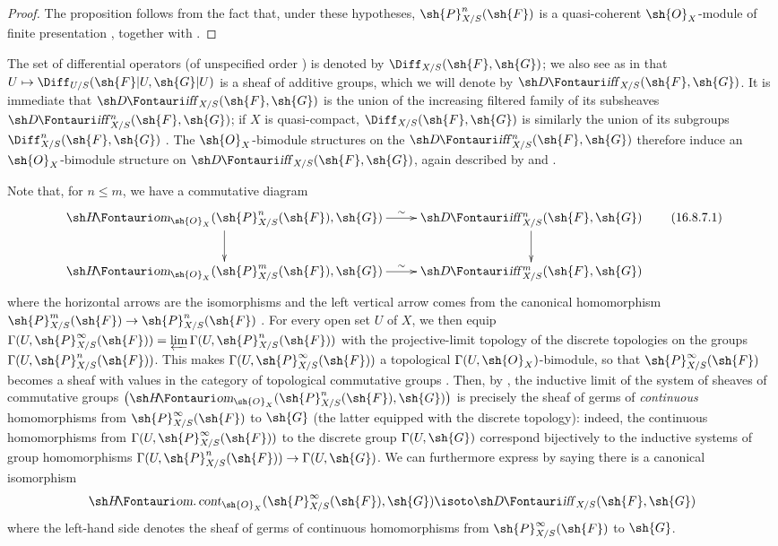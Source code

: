 \begin{proof}
The proposition follows from the fact that, under these hypotheses, $\sh{P}_{X/S}^n(\sh{F})$ is a quasi-coherent $\sh{O}_X$-module of finite presentation , together with .
\end{proof}

\begin{env}[16.8.7]
\label{IV.16.8.7}
The set of differential operators (of unspecified order ) is denoted by $\Diff_{X/S}(\sh{F}, \sh{G})$;
we also see as in  that $U \mapsto \Diff_{U/S}(\sh{F}|U, \sh{G}|U)$ is a sheaf of additive groups, which we will denote by $\shDiff_{X/S}(\sh{F}, \sh{G})$.
It is immediate that $\shDiff_{X/S}(\sh{F}, \sh{G})$ is the union of the increasing filtered family of its subsheaves $\shDiff_{X/S}^n(\sh{F}, \sh{G})$;
if $X$ is quasi-compact, $\Diff_{X/S}(\sh{F}, \sh{G})$ 
is similarly the union of its subgroups $\Diff_{X/S}^n(\sh{F}, \sh{G})$ .
The $\sh{O}_X$-bimodule structures on the $\shDiff_{X/S}^n(\sh{F}, \sh{G})$ therefore induce an $\sh{O}_X$-bimodule structure on $\shDiff_{X/S}(\sh{F}, \sh{G})$, again described by  and .

Note that, for $n \leq m$, we have a commutative diagram
\[
  \label{IV.16.8.7.1}
  \xymatrix{
    \shHom_{\sh{O}_X}(\sh{P}_{X/S}^n(\sh{F}), \sh{G}) \ar[r]^-{\sim} \ar[d] & \shDiff_{X/S}^n(\sh{F}, \sh{G}) \ar[d] \\
    \shHom_{\sh{O}_X}(\sh{P}_{X/S}^m(\sh{F}), \sh{G}) \ar[r]^-{\sim} & \shDiff_{X/S}^m(\sh{F}, \sh{G})
  }
  \tag{16.8.7.1}
\] 
where the horizontal arrows are the isomorphisms  and the left vertical arrow comes from the canonical homomorphism $\sh{P}_{X/S}^m(\sh{F}) \to \sh{P}_{X/S}^n(\sh{F})$ .
For every open set $U$ of $X$, we then equip $\Gamma(U, \sh{P}_{X/S}^\infty(\sh{F})) = \varprojlim \Gamma(U, \sh{P}_{X/S}^n(\sh{F}))$ with the projective-limit topology of the discrete topologies on the groups $\Gamma(U, \sh{P}_{X/S}^n(\sh{F}))$.  This makes $\Gamma(U, \sh{P}_{X/S}^\infty(\sh{F}))$ a topological $\Gamma(U, \sh{O}_X)$-bimodule, so that $\sh{P}_{X/S}^\infty(\sh{F})$ becomes a sheaf with values in the category of topological commutative groups .
Then, by \cite[II, 1.11]{I-4}, the inductive limit of the system of sheaves of commutative groups $\bigl(\shHom_{\sh{O}_X}(\sh{P}_{X/S}^n(\sh{F}), \sh{G})\bigr)$ is precisely the sheaf of germs of \emph{continuous} homomorphisms from $\sh{P}_{X/S}^\infty(\sh{F})$ to $\sh{G}$ (the latter equipped with the discrete topology):
indeed, the continuous homomorphisms from $\Gamma(U, \sh{P}_{X/S}^\infty(\sh{F}))$ to the discrete group $\Gamma(U, \sh{G})$ correspond bijectively to the inductive systems of group homomorphisms $\Gamma(U, \sh{P}_{X/S}^n(\sh{F})) \to \Gamma(U, \sh{G})$.
We can furthermore express  by saying there is a canonical isomorphism
\[
  \shHomcont_{\sh{O}_X} (\sh{P}_{X/S}^\infty(\sh{F}), \sh{G}) \isoto \shDiff_{X/S}(\sh{F}, \sh{G})
\]
where the left-hand side denotes the sheaf of germs of continuous homomorphisms from $\sh{P}_{X/S}^\infty(\sh{F})$ to $\sh{G}$.
\end{env}

